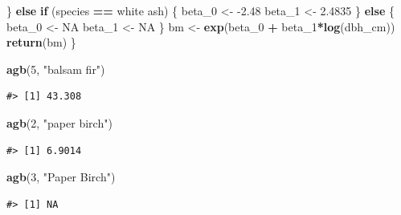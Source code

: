 \documentclass[
  11pt,
]{krantz}
\newenvironment{Shaded}{\begin{snugshade}}{\end{snugshade}}
\newcommand{\ControlFlowTok}[1]{\textcolor[rgb]{0.13,0.29,0.53}{\textbf{#1}}}
\newcommand{\DecValTok}[1]{\textcolor[rgb]{0.00,0.00,0.81}{#1}}
\newcommand{\FloatTok}[1]{\textcolor[rgb]{0.00,0.00,0.81}{#1}}
\newcommand{\KeywordTok}[1]{\textcolor[rgb]{0.13,0.29,0.53}{\textbf{#1}}}
\newcommand{\NormalTok}[1]{#1}
\newcommand{\OperatorTok}[1]{\textcolor[rgb]{0.81,0.36,0.00}{\textbf{#1}}}
\newcommand{\OtherTok}[1]{\textcolor[rgb]{0.56,0.35,0.01}{#1}}
\newcommand{\StringTok}[1]{\textcolor[rgb]{0.31,0.60,0.02}{#1}}
\theoremstyle{definition}
\theoremstyle{definition}
\theoremstyle{definition}
\theoremstyle{definition}
\theoremstyle{remark}
\begin{document}
\begin{Shaded}
\begin{Highlighting}[]
\NormalTok{  \} }\ControlFlowTok{else} \ControlFlowTok{if}\NormalTok{ (species }\OperatorTok{==}\StringTok{ \textquotesingle{}white ash\textquotesingle{}}\NormalTok{) \{}
\NormalTok{      beta\_}\DecValTok{0}\NormalTok{ \textless{}{-}}\StringTok{ }\FloatTok{{-}2.48}
\NormalTok{      beta\_}\DecValTok{1}\NormalTok{ \textless{}{-}}\StringTok{ }\FloatTok{2.4835}
\NormalTok{  \} }\ControlFlowTok{else}\NormalTok{ \{}
\NormalTok{      beta\_}\DecValTok{0}\NormalTok{ \textless{}{-}}\StringTok{ }\OtherTok{NA}
\NormalTok{      beta\_}\DecValTok{1}\NormalTok{ \textless{}{-}}\StringTok{ }\OtherTok{NA}
\NormalTok{  \}}
\NormalTok{  bm \textless{}{-}}\StringTok{ }\KeywordTok{exp}\NormalTok{(beta\_}\DecValTok{0} \OperatorTok{+}\StringTok{ }\NormalTok{beta\_}\DecValTok{1}\OperatorTok{*}\KeywordTok{log}\NormalTok{(dbh\_cm))}
  \KeywordTok{return}\NormalTok{(bm)}
\NormalTok{\}}

\KeywordTok{agb}\NormalTok{(}\DecValTok{5}\NormalTok{, }\StringTok{"balsam fir"}\NormalTok{)}
\end{Highlighting}
\end{Shaded}

\begin{verbatim}
#> [1] 43.308
\end{verbatim}

\begin{Shaded}
\begin{Highlighting}[]
\KeywordTok{agb}\NormalTok{(}\DecValTok{2}\NormalTok{, }\StringTok{"paper birch"}\NormalTok{)}
\end{Highlighting}
\end{Shaded}

\begin{verbatim}
#> [1] 6.9014
\end{verbatim}

\begin{Shaded}
\begin{Highlighting}[]
\KeywordTok{agb}\NormalTok{(}\DecValTok{3}\NormalTok{, }\StringTok{"Paper Birch"}\NormalTok{)}
\end{Highlighting}
\end{Shaded}

\begin{verbatim}
#> [1] NA
\end{verbatim}
\end{document}
